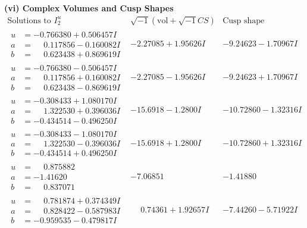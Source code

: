 \documentclass[1p]{elsarticle_modified}
\theoremstyle{definition}
\newcommand{\I}{\sqrt{-1}}
\begin{document}
\newpage\flushleft \textbf{(vi) Complex Volumes and Cusp Shapes}
$$\begin{array}{c|c|c}  
\text{Solutions to }I^u_{2}& \I (\text{vol} + \sqrt{-1}CS) & \text{Cusp shape}\\
 \hline 
\begin{aligned}
u &= -0.766380 + 0.506457 I \\
a &= \phantom{-}0.117856 - 0.160082 I \\
b &= \phantom{-}0.623438 + 0.869619 I\end{aligned}
 & -2.27085 + 1.95626 I & -9.24623 - 1.70967 I \\ \hline\begin{aligned}
u &= -0.766380 - 0.506457 I \\
a &= \phantom{-}0.117856 + 0.160082 I \\
b &= \phantom{-}0.623438 - 0.869619 I\end{aligned}
 & -2.27085 - 1.95626 I & -9.24623 + 1.70967 I \\ \hline\begin{aligned}
u &= -0.308433 + 1.080170 I \\
a &= \phantom{-}1.322530 + 0.396036 I \\
b &= -0.434514 - 0.496250 I\end{aligned}
 & -15.6918 - 1.2800 I & -10.72860 - 1.32316 I \\ \hline\begin{aligned}
u &= -0.308433 - 1.080170 I \\
a &= \phantom{-}1.322530 - 0.396036 I \\
b &= -0.434514 + 0.496250 I\end{aligned}
 & -15.6918 + 1.2800 I & -10.72860 + 1.32316 I \\ \hline\begin{aligned}
u &= \phantom{-}0.875882\phantom{ +0.000000I} \\
a &= -1.41620\phantom{ +0.000000I} \\
b &= \phantom{-}0.837071\phantom{ +0.000000I}\end{aligned}
 & -7.06851\phantom{ +0.000000I} & -1.41880\phantom{ +0.000000I} \\ \hline\begin{aligned}
u &= \phantom{-}0.781874 + 0.374349 I \\
a &= \phantom{-}0.828422 - 0.587983 I \\
b &= -0.959535 - 0.479817 I\end{aligned}
 & \phantom{-}0.74361 + 1.92657 I & -7.44260 - 5.71922 I \\ \hline\begin{aligned}

\end{aligned}
\end{array}$$
\end{document}
